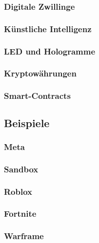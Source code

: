 \subsubsection{Digitale Zwillinge}
\subsubsection{Künstliche Intelligenz}
\subsubsection{LED und Hologramme}
\subsubsection{Kryptowährungen}
\subsubsection{Smart-Contracts}

\subsection{Beispiele}

\subsubsection{Meta}
\subsubsection{Sandbox}
\subsubsection{Roblox}
\subsubsection{Fortnite}
\subsubsection{Warframe}